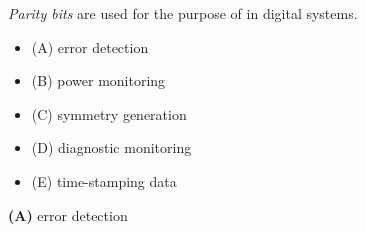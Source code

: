 

{\it Parity bits} are used for the purpose of \underbar{\hskip 50pt} in digital systems.

\begin{itemize}
\item{(A)} error detection
\vskip 5pt 
\item{(B)} power monitoring
\vskip 5pt 
\item{(C)} symmetry generation
\vskip 5pt 
\item{(D)} diagnostic monitoring
\vskip 5pt 
\item{(E)} time-stamping data
\end{itemize}







{\bf (A)} error detection
 










